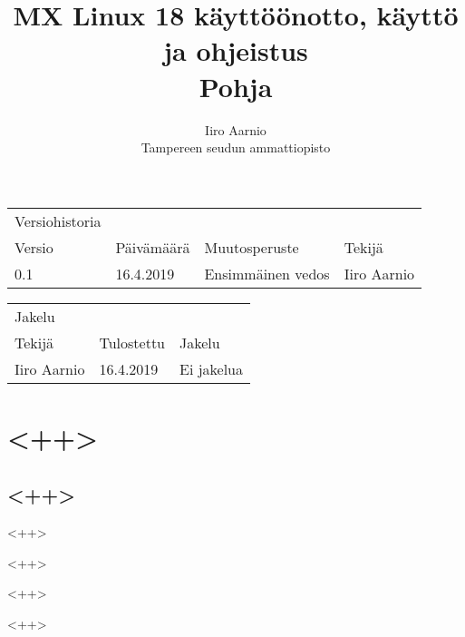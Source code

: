 \documentclass[a4paper, 12pt, finnish]{article}
\title{MX Linux 18 käyttöönotto, käyttö ja ohjeistus \\ \large Pohja} %
\author{Iiro Aarnio \\ Tampereen seudun ammattiopisto \\}
\begin{document}
\maketitle
\thispagestyle{empty} %

\newpage
\thispagestyle{empty}
\begin{table}[htpb]
	\begin{tabular}{llll}
		Versiohistoria &            &                         &             \\
		\rowcolor[HTML]{FFCCC9}
		Versio         & Päivämäärä & Muutosperuste           & Tekijä      \\
		0.1              & 16.4.2019   & Ensimmäinen vedos       & Iiro Aarnio \\
	\end{tabular}
\end{table}

\begin{table}[htpb]
	\begin{tabular}{lll}
		Jakelu &            &                                  \\
		\rowcolor[HTML]{FFCCC9}
		Tekijä         & Tulostettu & Jakelu                 \\
		Iiro Aarnio              & 16.4.2019   & Ei jakelua \\
	\end{tabular}
\end{table}

\newpage
\thispagestyle{empty} %

\tableofcontents

\newpage
{} %

\setcounter{page}{1} %
\newpage
\section{<++>}

\subsection{<++>}

<++>

\begin{adjustwidth}{0.4\textwidth}{}
        <++>
\end{adjustwidth}
<++>

\begin{adjustwidth}{0.4\textwidth}{}
        <++>
\end{adjustwidth}
\end{document}
